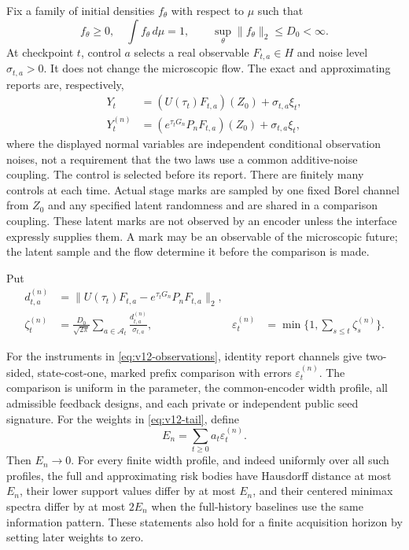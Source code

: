 Fix a family of initial densities $f_\theta$ with respect to $\mu$ such
that
\begin{equation}
 f_\theta\ge0,\quad\int f_\theta\,d\mu=1,
 \qquad \sup_\theta\|f_\theta\|_2\le D_0<\infty.
 \label{eq:v12-preparation}
\end{equation}
At checkpoint $t$, control $a$ selects a real observable $F_{t,a}\in H$
and noise level $\sigma_{t,a}>0$. It does not change the microscopic
flow. The exact and approximating reports are, respectively,
\begin{align}
 Y_t&=(U(\tau_t)F_{t,a})(Z_0)+\sigma_{t,a}\xi_t,\nonumber\\
 Y_t^{(n)}&=(e^{\tau_tG_n}P_nF_{t,a})(Z_0)+\sigma_{t,a}\xi_t,
 \label{eq:v12-observations}
\end{align}
where the displayed normal variables are independent conditional
observation noises, not a requirement that the two laws use a common
additive-noise coupling. The control is selected before its report.
There are finitely many controls at each time. Actual stage marks are
sampled by one fixed Borel channel from $Z_0$ and any specified latent
randomness and are shared in a comparison coupling. These latent marks
are not observed by an encoder unless the interface expressly supplies
them. A mark may be an observable of the microscopic future; the latent
sample and the flow determine it before the comparison is made.

Put
\begin{align}
 d_{t,a}^{(n)}&=\|U(\tau_t)F_{t,a}
                    -e^{\tau_tG_n}P_nF_{t,a}\|_2,\nonumber\\
 \zeta_t^{(n)}&=\frac{D_0}{\sqrt{2\pi}}
                   \sum_{a\in\mathcal A_t}\frac{d_{t,a}^{(n)}}{\sigma_{t,a}},
 &\varepsilon_t^{(n)}&=\min\{1,\textstyle\sum_{s\le t}\zeta_s^{(n)}\}.
 \label{eq:v12-zeta}
\end{align}

\begin{theorem}
\label{thm:v12-physical}
For the instruments in \eqref{eq:v12-observations}, identity report
channels give two-sided, state-cost-one, marked prefix comparison with
errors $\varepsilon_t^{(n)}$. The comparison is uniform in the parameter,
the common-encoder width profile, all admissible feedback designs, and
each private or independent public seed signature.
For the weights in \eqref{eq:v12-tail}, define
\begin{equation}
 E_n=\sum_{t\ge0}a_t\varepsilon_t^{(n)}.
 \label{eq:v12-physical-error}
\end{equation}
Then $E_n\to0$. For every finite width profile, and indeed uniformly over
all such profiles, the full and approximating risk bodies have Hausdorff
distance at most $E_n$, their lower support values differ by at most
$E_n$, and their centered minimax spectra differ by at most $2E_n$ when
the full-history baselines use the same information pattern. These
statements also hold for a finite acquisition horizon by setting later
weights to zero.
\end{theorem}

